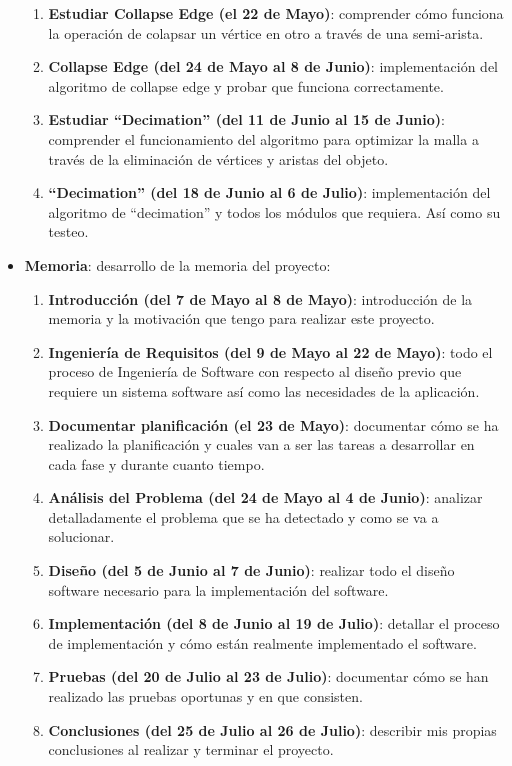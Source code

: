 \begin{itemize}
\begin{enumerate}
		\item \textbf{Estudiar Collapse Edge (el 22 de Mayo)}: comprender cómo funciona la operación de colapsar un vértice en otro a través de una semi-arista.
		
		\item \textbf{Collapse Edge (del 24 de Mayo al 8 de Junio)}: implementación del algoritmo de collapse edge y probar que funciona correctamente.
		
		\item \textbf{Estudiar ``Decimation'' (del 11 de Junio al 15 de Junio)}: comprender el funcionamiento del algoritmo para optimizar la malla a través de la eliminación de vértices y aristas del objeto.
		
		\item \textbf{``Decimation'' (del 18 de Junio al 6 de Julio)}: implementación del algoritmo de ``decimation'' y todos los módulos que requiera. Así como su testeo.
	\end{enumerate}

	\item[] \textbf{Memoria}: desarrollo de la memoria del proyecto:
	\begin{enumerate}
		\item \textbf{Introducción (del 7 de Mayo al 8 de Mayo)}: introducción de la memoria y la motivación que tengo para realizar este proyecto.
		
		\item \textbf{Ingeniería de Requisitos (del 9 de Mayo al 22 de Mayo)}: todo el proceso de Ingeniería de Software con respecto al diseño previo que requiere un sistema software así como las necesidades de la aplicación.
		
		\item \textbf{Documentar planificación (el 23 de Mayo)}: documentar cómo se ha realizado la planificación y cuales van a ser las tareas a desarrollar en cada fase y durante cuanto tiempo.
		
		\item \textbf{Análisis del Problema (del 24 de Mayo al 4 de Junio)}: analizar detalladamente el problema que se ha detectado y como se va a solucionar.
		
		\item \textbf{Diseño (del 5 de Junio al 7 de Junio)}: realizar todo el diseño software necesario para la implementación del software.
		
		\item \textbf{Implementación (del 8 de Junio al 19 de Julio)}: detallar el proceso de implementación y cómo están realmente implementado el software.
		
		\item \textbf{Pruebas (del 20 de Julio al 23 de Julio)}: documentar cómo se han realizado las pruebas oportunas y en que consisten.
		
		\item \textbf{Conclusiones (del 25 de Julio al 26 de Julio)}: describir mis propias conclusiones al realizar y terminar el proyecto.
	\end{enumerate}
	
\end{itemize}

